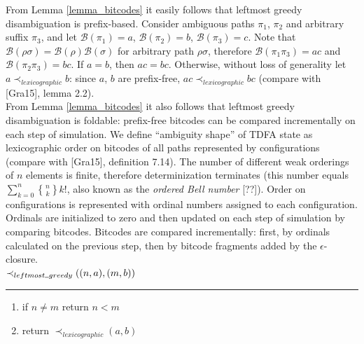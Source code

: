 \documentclass{article}
\newcommand{\Xund}{\rule{.4em}{.4pt}} %
\newcommand{\Xeq}{\!=\!}
\newcommand{\XB}{\mathcal{B}}
\newcommand{\Xstirling}[2]{\genfrac{\{}{\}}{0pt}{}{#1}{#2}}
\theoremstyle{definition}
\begin{document}
\begin{multicols}{2}
From Lemma \ref{lemma_bitcodes} it easily follows that leftmost greedy disambiguation is prefix-based.
Consider ambiguous paths $\pi_1$, $\pi_2$ and arbitrary suffix $\pi_3$,
and let $\XB(\pi_1) \Xeq a$, $\XB(\pi_2) \Xeq b$, $\XB(\pi_3) \Xeq c$.
Note that $\XB(\rho\sigma) \Xeq \XB(\rho)\XB(\sigma)$ for arbitrary path $\rho\sigma$,
therefore $\XB(\pi_1\pi_3) \Xeq ac$ and $\XB(\pi_2\pi_3) \Xeq bc$.
If $a \Xeq b$, then $ac \Xeq bc$.
Otherwise, without loss of generality let $a \prec_{lexicographic} b$: since $a$, $b$ are prefix-free, $ac \prec_{lexicographic} bc$
(compare with [Gra15], lemma 2.2).
\\

From Lemma \ref{lemma_bitcodes} it also follows that leftmost greedy disambiguation is foldable:
prefix-free bitcodes can be compared incrementally on each step of simulation.
We define ``ambiguity shape'' of TDFA state as lexicographic order on bitcodes of all paths represented by configurations
(compare with [Gra15], definition 7.14).
The number of different weak orderings of $n$ elements is finite, therefore determinization terminates
(this number equals $\sum_{k=0}^n \Xstirling{n}{k} k!$, also known as the \emph{ordered Bell number} [??]).
Order on configurations is represented with ordinal numbers assigned to each configuration.
Ordinals are initialized to zero and then updated on each step of simulation by comparing bitcodes.
Bitcodes are compared incrementally:
first, by ordinals calculated on the previous step, then by bitcode fragments added by the $\epsilon$-closure.
\\

    $\prec_{leftmost \Xund greedy} ((n, a), (m, b))$
    \hrule
    \begin{enumerate}[leftmargin=0in]
        \smallskip
        \item[] if $n \!\neq\! m$ return $n \!<\! m$
        \item[] return $\prec_{lexicographic} (a, b)$
        \\
    \end{enumerate}

    \bigskip


\end{multicols}
\end{document}
